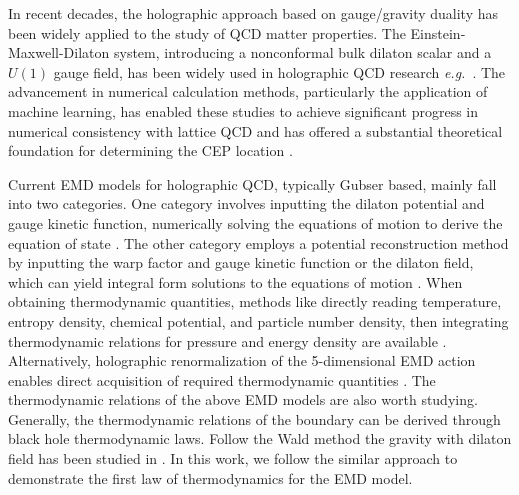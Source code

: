 \documentclass[a4paper,12pt]{article}
\numberwithin{equation}{section}
\begin{document}
In recent decades, the holographic approach based on gauge/gravity duality has been widely applied to the study of QCD matter properties. The Einstein-Maxwell-Dilaton system, introducing a nonconformal bulk dilaton scalar and a $U(1)$ gauge field, has been widely used in holographic QCD research \emph{e.g.}~\cite{ DeWolfe:2010he, DeWolfe:2011ts, Cai:2012xh, Cai:2012eh, Finazzo:2013efa, Yang:2014bqa, Critelli:2017oub, Li:2017ple, Chen:2017cyc, Knaute:2017opk, Fang:2018axm, Ballon-Bayona:2020xls, Li:2020hau, Grefa:2021qvt, He:2022amv, Grefa:2022fpu,Chen:2024ckb}. The advancement in numerical calculation methods, particularly the application of machine learning, has enabled these studies to achieve significant progress in numerical consistency with lattice QCD and has offered a substantial theoretical foundation for determining the CEP location \cite{Cai:2022omk,Hippert:2023bel,Chen:2024ckb,Luo:2024iwf,Zhu:2025gxo,Sun:2025uga}. 

Current EMD models for holographic QCD, typically Gubser based, mainly fall into two categories. One category involves inputting the dilaton potential and gauge kinetic function, numerically solving the equations of motion to derive the equation of state \cite{DeWolfe:2010he, DeWolfe:2011ts, Finazzo:2013efa, Critelli:2017oub, Knaute:2017opk, Grefa:2021qvt, He:2022amv, Grefa:2022fpu, Li:2024lrh}. The other category employs a potential reconstruction method by inputting the warp factor and gauge kinetic function or the dilaton field, which can yield integral form solutions to the equations of motion \cite{Cai:2012xh, Cai:2012eh, Yang:2014bqa, Li:2017ple, Chen:2017cyc, Fang:2018axm, Ballon-Bayona:2020xls, Li:2020hau, Chen:2024ckb, Li:2025ugv}. When obtaining thermodynamic quantities, methods like directly reading temperature, entropy density, chemical potential, and particle number density, then integrating thermodynamic relations for pressure and energy density are available \cite{DeWolfe:2010he, DeWolfe:2011ts}. Alternatively, holographic renormalization of the 5-dimensional EMD action enables direct acquisition of required thermodynamic quantities  \cite{Cai:2022omk, Li:2023mpv}. The thermodynamic relations of the above EMD models are also worth studying. Generally, the thermodynamic relations of the boundary can be derived through black hole thermodynamic laws. Follow the Wald method \cite{Wald:1993nt,Iyer:1994ys} the gravity with dilaton field has been studied in \cite{Liu:2013gja,Lu:2014maa,Liu:2017kml,Li:2020spf}. In this work, we follow the similar approach to demonstrate the first law of thermodynamics for the EMD model. 
\end{document}
